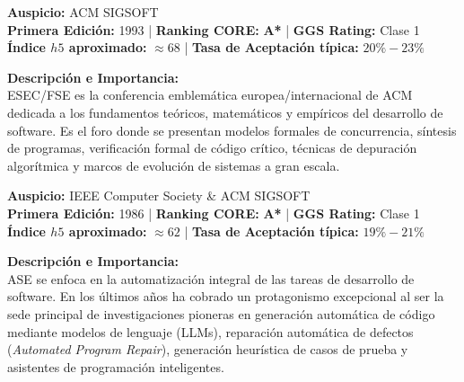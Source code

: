 \documentclass[12pt,a4paper]{article}
\begin{document}
\vspace{0.4cm}

\begin{tcolorbox}[colback=white,colframe=tierAStar,title={\textbf{2. ACM ESEC/FSE -- Foundations of Software Engineering}},fonttitle=\bfseries]
\textbf{Auspicio:} ACM SIGSOFT \\
\textbf{Primera Edición:} 1993 \quad | \quad \textbf{Ranking CORE:} \textbf{A*} \quad | \quad \textbf{GGS Rating:} Clase 1 \\
\textbf{Índice $h5$ aproximado:} $\approx 68$ \quad | \quad \textbf{Tasa de Aceptación típica:} $20\% - 23\%$
\end{tcolorbox}
\textbf{Descripción e Importancia:} \\
ESEC/FSE es la conferencia emblemática europea/internacional de ACM dedicada a los fundamentos teóricos, matemáticos y empíricos del desarrollo de software. Es el foro donde se presentan modelos formales de concurrencia, síntesis de programas, verificación formal de código crítico, técnicas de depuración algorítmica y marcos de evolución de sistemas a gran escala.

\vspace{0.4cm}

\begin{tcolorbox}[colback=white,colframe=tierAStar,title={\textbf{3. ASE -- IEEE/ACM International Conference on Automated Software Engineering}},fonttitle=\bfseries]
\textbf{Auspicio:} IEEE Computer Society \& ACM SIGSOFT \\
\textbf{Primera Edición:} 1986 \quad | \quad \textbf{Ranking CORE:} \textbf{A*} \quad | \quad \textbf{GGS Rating:} Clase 1 \\
\textbf{Índice $h5$ aproximado:} $\approx 62$ \quad | \quad \textbf{Tasa de Aceptación típica:} $19\% - 21\%$
\end{tcolorbox}
\textbf{Descripción e Importancia:} \\
ASE se enfoca en la automatización integral de las tareas de desarrollo de software. En los últimos años ha cobrado un protagonismo excepcional al ser la sede principal de investigaciones pioneras en generación automática de código mediante modelos de lenguaje (LLMs), reparación automática de defectos (\textit{Automated Program Repair}), generación heurística de casos de prueba y asistentes de programación inteligentes.

\vspace{0.4cm}
\end{document}
